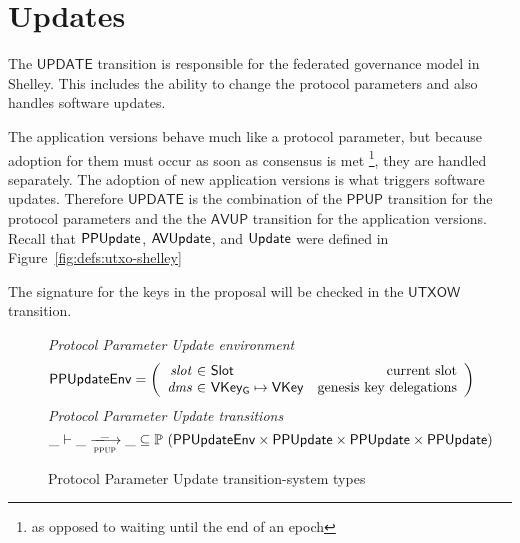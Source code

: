 \section{Updates}
\label{sec:update}


The $\mathsf{UPDATE}$ transition is responsible for the federated governance model in Shelley.
This includes the ability to change the protocol parameters and also handles software
updates.

The application versions behave much like a protocol parameter, but because adoption
for them must occur as soon as consensus is met
\footnote{as opposed to waiting until the end of an epoch},
they are handled separately.
The adoption of new application versions is what triggers software updates.
Therefore $\mathsf{UPDATE}$ is the combination of the
$\mathsf{PPUP}$ transition for the protocol parameters and the
the $\mathsf{AVUP}$ transition for the application versions.
Recall that $\mathsf{PPUpdate}$, $\mathsf{AVUpdate}$, and $\mathsf{Update}$ were defined in
Figure~\ref{fig:defs:utxo-shelley}


The signature for the keys in the proposal will be checked in the
$\mathsf{UTXOW}$ transition.


\begin{figure}[htb]
  \emph{Protocol Parameter Update environment}
  \begin{equation*}
    \PPUpdateEnv =
    \left(
      \begin{array}{r@{~\in~}lr}
        \var{slot} & \Slot & \text{current slot}\\
        \var{dms} & \VKeyGen\mapsto\VKey & \text{genesis key delegations} \\
      \end{array}
    \right)
  \end{equation*}
  \emph{Protocol Parameter Update transitions}
  \begin{equation*}
    \_ \vdash
    \var{\_} \trans{ppup}{\_} \var{\_}
    \subseteq \powerset (\PPUpdateEnv \times \PPUpdate \times \PPUpdate \times \PPUpdate)
  \end{equation*}
  \caption{Protocol Parameter Update transition-system types}
  \label{fig:ts-types:pp-update}
\end{figure}

